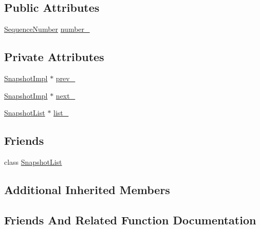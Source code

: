 \subsection*{Public Attributes}
\begin{DoxyCompactItemize}
\item 
\hyperlink{namespaceleveldb_a5481ededd221c36d652c371249f869fa}{Sequence\+Number} \hyperlink{classleveldb_1_1_snapshot_impl_aa31dca969679d05d17c4c0eb1443a96e}{number\+\_\+}
\end{DoxyCompactItemize}
\subsection*{Private Attributes}
\begin{DoxyCompactItemize}
\item 
\hyperlink{classleveldb_1_1_snapshot_impl}{Snapshot\+Impl} $\ast$ \hyperlink{classleveldb_1_1_snapshot_impl_a562cbefac390343cf1d8cd543b9a7d32}{prev\+\_\+}
\item 
\hyperlink{classleveldb_1_1_snapshot_impl}{Snapshot\+Impl} $\ast$ \hyperlink{classleveldb_1_1_snapshot_impl_a4cd084fe53c616fca125a50cf6f64cb2}{next\+\_\+}
\item 
\hyperlink{classleveldb_1_1_snapshot_list}{Snapshot\+List} $\ast$ \hyperlink{classleveldb_1_1_snapshot_impl_ac2b7d24074cfe0dcdce4be956016a5d1}{list\+\_\+}
\end{DoxyCompactItemize}
\subsection*{Friends}
\begin{DoxyCompactItemize}
\item 
class \hyperlink{classleveldb_1_1_snapshot_impl_abe14b2fb5e32159324c619e1a42327a0}{Snapshot\+List}
\end{DoxyCompactItemize}
\subsection*{Additional Inherited Members}


\subsection{Friends And Related Function Documentation}
\hypertarget{classleveldb_1_1_snapshot_impl_abe14b2fb5e32159324c619e1a42327a0}{}
